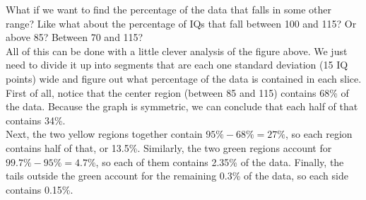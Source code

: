\begin{center}
\end{center}
\vfill

What if we want to find the percentage of the data that falls in some other range?  Like what about the percentage of IQs that fall between 100 and 115?  Or above 85?  Between 70 and 115?\\

All of this can be done with a little clever analysis of the figure above.  We just need to divide it up into segments that are each one standard deviation (15 IQ points) wide and figure out what percentage of the data is contained in each slice.\\

First of all, notice that the center region (between 85 and 115) contains 68\% of the data.  Because the graph is symmetric, we can conclude that each half of that contains 34\%.\\

Next, the two yellow regions together contain $95\%-68\% = 27\%$, so each region contains half of that, or 13.5\%.  Similarly, the two green regions account for $99.7\%-95\% = 4.7\%$, so each of them contains 2.35\% of the data.  Finally, the tails outside the green account for the remaining 0.3\% of the data, so each side contains 0.15\%.\\
\vfill


